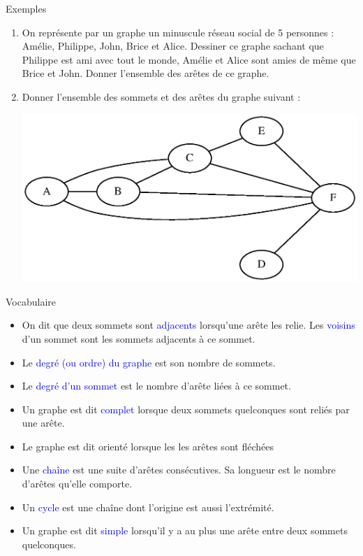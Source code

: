 \documentclass[10pt]{beamer}
\begin{document}
\begin{frame}
	\mframe{\GR}
	\begin{exampleblock}{Exemples}
		\begin{enumerate}
			\item On représente par un graphe un minuscule réseau social de 5 personnes : Amélie, Philippe, John, Brice et Alice. Dessiner ce graphe sachant que Philippe est ami avec tout le monde, Amélie et Alice sont amies de même que Brice et John. Donner l'ensemble des arêtes de ce graphe.
			\item Donner l'ensemble des sommets et des arêtes du graphe suivant :
			      \begin{center}
				      \includegraphics[scale=0.4]{graph1.eps}
			      \end{center}
		\end{enumerate}
	\end{exampleblock}
\end{frame}

\begin{frame}
	\mframe{\GR}
	\begin{block}{Vocabulaire}
		\begin{itemize}
			\item<1-> On dit que deux sommets sont \textcolor{blue}{adjacents} lorsqu'une arête les relie. Les \textcolor{blue}{voisins} d'un sommet sont les sommets adjacents à ce sommet.
			\item<2-> Le \textcolor{blue}{degré (ou ordre) du graphe} est son nombre de sommets.
			\item<3-> Le \textcolor{blue}{degré d'un sommet} est le nombre d'arête liées à ce sommet.
			\item<4-> Un graphe est dit \textcolor{blue}{complet} lorsque deux sommets quelconques sont reliés par une arête.
			\item<5-> Le graphe est dit orienté lorsque les \og les arêtes sont fléchées \fg
			\item<6-> Une \textcolor{blue}{chaîne} est une suite d'arêtes consécutives. Sa longueur est le nombre d'arêtes qu'elle comporte.
			\item<7-> Un \textcolor{blue}{cycle} est une chaîne dont l'origine est aussi l'extrémité.
			\item<8-> Un graphe est dit \textcolor{blue}{simple} lorsqu'il y a au plus une arête entre deux sommets quelconques.
		\end{itemize}
	\end{block}
\end{frame}
\end{document}
